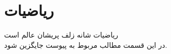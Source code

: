 \chapter{ریاضیات}

{ریاضیات شانه زلف پریشان عالم است}
\\

در این قسمت مطالب مربوط به پیوست جایگزین شود.